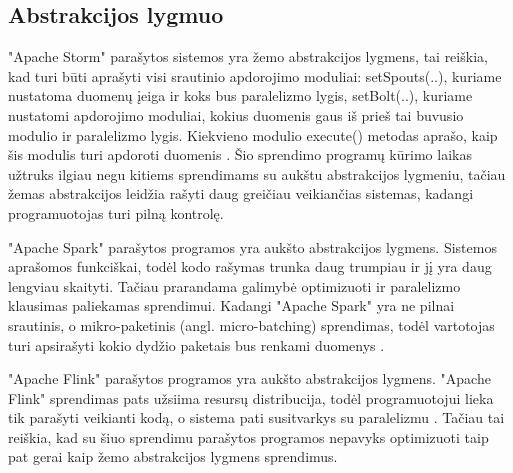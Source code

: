 \documentclass{VUMIFPSbakalaurinis}
\begin{document}
\subsection{Abstrakcijos lygmuo}

"Apache Storm" parašytos sistemos yra žemo abstrakcijos lygmens, tai reiškia, kad turi būti aprašyti visi srautinio apdorojimo moduliai: 
setSpouts(..), kuriame nustatoma duomenų įeiga ir koks bus paralelizmo lygis, setBolt(..), kuriame nustatomi apdorojimo moduliai, kokius duomenis gaus iš prieš tai buvusio modulio ir paralelizmo lygis. Kiekvieno modulio execute() metodas aprašo, kaip šis modulis turi apdoroti duomenis \cite{tutpoint}. Šio sprendimo programų kūrimo laikas užtruks ilgiau negu kitiems sprendimams su aukštu abstrakcijos lygmeniu, tačiau žemas abstrakcijos leidžia rašyti daug greičiau veikiančias sistemas, kadangi programuotojas turi pilną kontrolę. \par

"Apache Spark" parašytos programos yra aukšto abstrakcijos lygmens. Sistemos aprašomos funkciškai, todėl kodo rašymas trunka daug trumpiau ir jį yra daug lengviau skaityti. Tačiau prarandama galimybė optimizuoti ir paralelizmo klausimas paliekamas sprendimui. Kadangi "Apache Spark" yra ne pilnai srautinis, o mikro-paketinis (angl. micro-batching) sprendimas, todėl vartotojas turi apsirašyti kokio dydžio paketais bus renkami duomenys \cite{shoro2015big}. \par

"Apache Flink" parašytos programos yra aukšto abstrakcijos lygmens. "Apache Flink" sprendimas pats užsiima resursų distribucija, todėl programuotojui lieka tik parašyti veikianti kodą, o sistema pati susitvarkys su paralelizmu \cite{flinkdoc}. Tačiau tai reiškia, kad su šiuo sprendimu parašytos programos nepavyks optimizuoti taip pat gerai kaip žemo abstrakcijos lygmens sprendimus. \par
\end{document}
